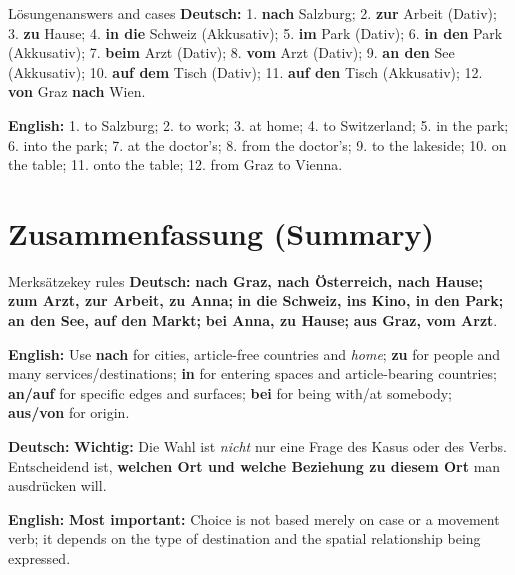 \documentclass[a4paper,11pt]{article}
\newcommand{\GermanText}[1]{\textbf{Deutsch: }#1\par}
\newcommand{\EnglishText}[1]{{\small\color{SoftGray}\textbf{English: }#1\par}}
\begin{document}
\begin{grammarentry}{Lösungen}{answers and cases}
\GermanText{1. \textbf{nach} Salzburg; 2. \textbf{zur} Arbeit (Dativ); 3. \textbf{zu} Hause; 4. \textbf{in die} Schweiz (Akkusativ); 5. \textbf{im} Park (Dativ); 6. \textbf{in den} Park (Akkusativ); 7. \textbf{beim} Arzt (Dativ); 8. \textbf{vom} Arzt (Dativ); 9. \textbf{an den} See (Akkusativ); 10. \textbf{auf dem} Tisch (Dativ); 11. \textbf{auf den} Tisch (Akkusativ); 12. \textbf{von} Graz \textbf{nach} Wien.}
\EnglishText{1. to Salzburg; 2. to work; 3. at home; 4. to Switzerland; 5. in the park; 6. into the park; 7. at the doctor's; 8. from the doctor's; 9. to the lakeside; 10. on the table; 11. onto the table; 12. from Graz to Vienna.}
\end{grammarentry}

\section{Zusammenfassung (Summary)}
\begin{grammarentry}{Merksätze}{key rules}
\GermanText{\textbf{nach Graz, nach Österreich, nach Hause;} \textbf{zum Arzt, zur Arbeit, zu Anna;} \textbf{in die Schweiz, ins Kino, in den Park;} \textbf{an den See, auf den Markt;} \textbf{bei Anna, zu Hause;} \textbf{aus Graz, vom Arzt}.}
\EnglishText{Use \textbf{nach} for cities, article-free countries and \emph{home}; \textbf{zu} for people and many services/destinations; \textbf{in} for entering spaces and article-bearing countries; \textbf{an/auf} for specific edges and surfaces; \textbf{bei} for being with/at somebody; \textbf{aus/von} for origin.}
\GermanText{\textbf{Wichtig:} Die Wahl ist \emph{nicht} nur eine Frage des Kasus oder des Verbs. Entscheidend ist, \textbf{welchen Ort und welche Beziehung zu diesem Ort} man ausdrücken will.}
\EnglishText{\textbf{Most important:} Choice is not based merely on case or a movement verb; it depends on the type of destination and the spatial relationship being expressed.}
\end{grammarentry}
\end{document}
